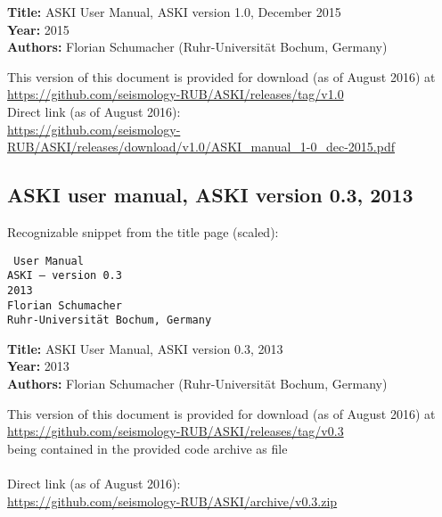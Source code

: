 {\bf Title: } ASKI User Manual, ASKI version 1.0, December 2015\\
{\bf Year: } 2015\\
{\bf Authors: } Florian Schumacher (Ruhr-Universit\"at Bochum, Germany)

This version of this document is provided for download (as of August 2016) at\\
\url{https://github.com/seismology-RUB/ASKI/releases/tag/v1.0}\\
Direct link (as of August 2016):\\
\url{https://github.com/seismology-RUB/ASKI/releases/download/v1.0/ASKI_manual_1-0_dec-2015.pdf}


\subsection*{ASKI user manual, ASKI version 0.3, 2013}

Recognizable snippet from the title page (scaled):

\begin{minipage}{0.45\textwidth}
  \begin{flushright} \tt
      {\LARGE User Manual} \\[1em]
      {\large ASKI} {\rm --} version 0.3 \\[1em]
      2013 \\
      Florian Schumacher \\ 
      {\footnotesize Ruhr-Universit\"at Bochum, Germany}
  \end{flushright}
\end{minipage}
\vspace*{1ex}

{\bf Title: } ASKI User Manual, ASKI version 0.3, 2013\\
{\bf Year: } 2013\\
{\bf Authors: } Florian Schumacher (Ruhr-Universit\"at Bochum, Germany)

This version of this document is provided for download (as of August 2016) at\\
\url{https://github.com/seismology-RUB/ASKI/releases/tag/v0.3}\\
being contained in the provided  code archive as file \\
\\
Direct link (as of August 2016):\\
\url{https://github.com/seismology-RUB/ASKI/archive/v0.3.zip}

